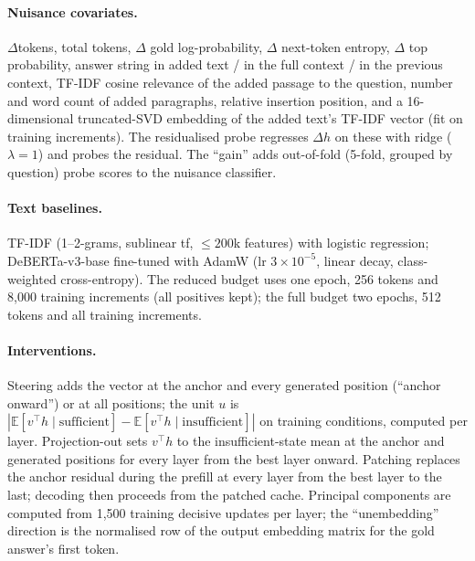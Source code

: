 \paragraph{Nuisance covariates.} $\Delta$tokens, total tokens, $\Delta$ gold log-probability, $\Delta$ next-token entropy, $\Delta$ top probability, answer string in added text / in the full context / in the previous context, TF-IDF cosine relevance of the added passage to the question, number and word count of added paragraphs, relative insertion position, and a 16-dimensional truncated-SVD embedding of the added text's TF-IDF vector (fit on training increments). The residualised probe regresses $\Delta h$ on these with ridge ($\lambda=1$) and probes the residual. The ``gain'' adds out-of-fold (5-fold, grouped by question) probe scores to the nuisance classifier.

\paragraph{Text baselines.} TF-IDF (1--2-grams, sublinear tf, $\le200$k features) with logistic regression; DeBERTa-v3-base fine-tuned with AdamW (lr $3{\times}10^{-5}$, linear decay, class-weighted cross-entropy). The reduced budget uses one epoch, 256 tokens and 8{,}000 training increments (all positives kept); the full budget two epochs, 512 tokens and all training increments.

\paragraph{Interventions.} Steering adds the vector at the anchor and every generated position (``anchor onward'') or at all positions; the unit $u$ is $|\mathbb E[v^\top h\mid\text{sufficient}]-\mathbb E[v^\top h\mid\text{insufficient}]|$ on training conditions, computed per layer. Projection-out sets $v^\top h$ to the insufficient-state mean at the anchor and generated positions for every layer from the best layer onward. Patching replaces the anchor residual during the prefill at every layer from the best layer to the last; decoding then proceeds from the patched cache. Principal components are computed from 1{,}500 training decisive updates per layer; the ``unembedding'' direction is the normalised row of the output embedding matrix for the gold answer's first token.
